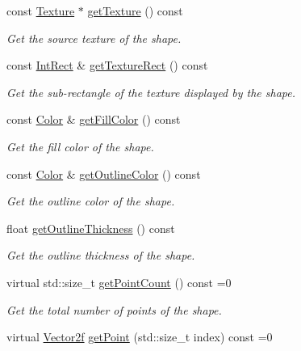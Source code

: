 \begin{DoxyCompactItemize}
const \mbox{\hyperlink{classsf_1_1_texture}{Texture}} $\ast$ \mbox{\hyperlink{classsf_1_1_shape_a06682d37fd38d8fad56afdd5228b6951}{get\+Texture}} () const
\begin{DoxyCompactList}\small\item\em Get the source texture of the shape. \end{DoxyCompactList}\item 
const \mbox{\hyperlink{classsf_1_1_rect}{Int\+Rect}} \& \mbox{\hyperlink{classsf_1_1_shape_ac878aab03c230dc31c44e250d092b9ea}{get\+Texture\+Rect}} () const
\begin{DoxyCompactList}\small\item\em Get the sub-\/rectangle of the texture displayed by the shape. \end{DoxyCompactList}\item 
const \mbox{\hyperlink{classsf_1_1_color}{Color}} \& \mbox{\hyperlink{classsf_1_1_shape_ae3030128824e687f259d18addcf33528}{get\+Fill\+Color}} () const
\begin{DoxyCompactList}\small\item\em Get the fill color of the shape. \end{DoxyCompactList}\item 
const \mbox{\hyperlink{classsf_1_1_color}{Color}} \& \mbox{\hyperlink{classsf_1_1_shape_a6598feed5fea1325a36b0f3a615ac55c}{get\+Outline\+Color}} () const
\begin{DoxyCompactList}\small\item\em Get the outline color of the shape. \end{DoxyCompactList}\item 
float \mbox{\hyperlink{classsf_1_1_shape_a1d4d5299c573a905e5833fc4dce783a7}{get\+Outline\+Thickness}} () const
\begin{DoxyCompactList}\small\item\em Get the outline thickness of the shape. \end{DoxyCompactList}\item 
virtual std\+::size\+\_\+t \mbox{\hyperlink{classsf_1_1_shape_af988dd61a29803fc04d02198e44b5643}{get\+Point\+Count}} () const =0
\begin{DoxyCompactList}\small\item\em Get the total number of points of the shape. \end{DoxyCompactList}\item 
virtual \mbox{\hyperlink{classsf_1_1_vector2}{Vector2f}} \mbox{\hyperlink{classsf_1_1_shape_a40e5d83713eb9f0c999944cf96458085}{get\+Point}} (std\+::size\+\_\+t index) const =0

\end{DoxyCompactItemize}
